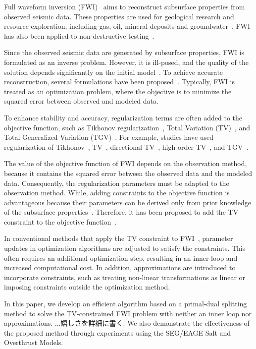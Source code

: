 Full waveform inversion (FWI)~\cite{FWI0,FWI1} aims to reconstruct subsurface properties from observed seismic data.
These properties are used for geological research and resource exploration, including gas, oil, mineral deposits and groundwater~\cite{FWI1,FWIApplicationGroundwater0,FWIApplicationGroundwater1}.
FWI has also been applied to non-destructive testing~\cite{FWIApplicationNonDestructiveTesting0,FWIApplicationNonDestructiveTesting1}.

Since the observed seismic data are generated by subsurface properties, FWI is formulated as an inverse problem.
However, it is ill-posed, and the quality of the solution depends significantly on the initial model~\cite{FWI1}.
To achieve accurate reconstruction, several formulations have been proposed~\cite{FWI0,CustomFWI0,CustomFWI1,CustomFWI2,CustomFWI3,CustomFWI4,CustomFWI5}.
Typically, FWI is treated as an optimization problem, where the objective is to minimize the squared error between observed and modeled data.

To enhance stability and accuracy, regularization terms are often added to the objective function, such as Tikhonov regularization~\cite{tikhonov}, Total Variation (TV)~\cite{TV}, and Total Generalized Variation (TGV)~\cite{TGV}.
For example, studies have used regularization of Tikhonov~\cite{FWI-with-tikhonov-regularization}, TV~\cite{FWI-with-TV-regularization}, directional TV~\cite{FWI-with-directional-TV-regularization}, high-order TV~\cite{FWI-with-high-order-TV-regularization}, and TGV~\cite{FWI-with-TGV-regularization}.

The value of the objective function of FWI depends on the observation method, because it contains the squared error between the observed data and the modeled data.
Consequently, the regularization parameters must be adapted to the observation method.
While, adding constraints to the objective function is advantageous because their parameters can be derived only from prior knowledge of the subsurface properties~\cite{constraints-vs-penalties-in-FWI}.
Therefore, it has been proposed to add the TV constraint to the objective function~\cite{FWI-with-TV-constraint,FWI-with-TV-constraint2,FWI-with-TV-constraint3}.

In conventional methods that apply the TV constraint to FWI~\cite{FWI-with-TV-constraint,FWI-with-TV-constraint2}, parameter updates in optimization algorithms are adjusted to satisfy the constraints.
This often requires an additional optimization step, resulting in an inner loop and increased computational cost.
In addition, approximations are introduced to incorporate constraints, such as treating non-linear transformations as linear or imposing constraints outside the optimization method.

In this paper, we develop an efficient algorithm based on a primal-dual splitting method to solve the TV-constrained FWI problem with neither an inner loop nor approximations.
...嬉しさを詳細に書く.
We also demonstrate the effectiveness of the proposed method through experiments using the SEG/EAGE Salt and Overthrust Models.



